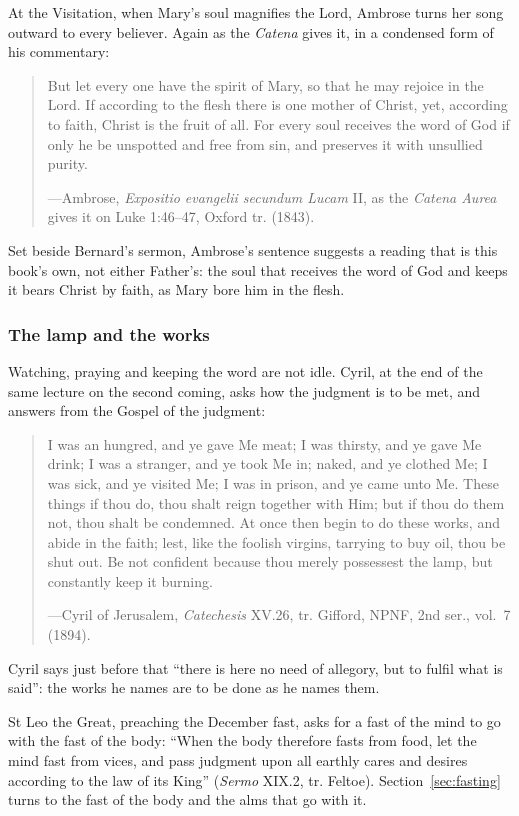 At the Visitation, when Mary's soul magnifies the Lord, Ambrose turns her song outward to every
believer. Again as the \textit{Catena} gives it, in a condensed form of his commentary:

\begin{quote}
But let every one have the spirit of Mary, so that he may rejoice in the Lord. If according to the
flesh there is one mother of Christ, yet, according to faith, Christ is the fruit of all. For every
soul receives the word of God if only he be unspotted and free from sin, and preserves it with
unsullied purity.\par
{\smallskip\noindent\small ---Ambrose, \textit{Expositio evangelii secundum Lucam} II, as the
\textit{Catena Aurea} gives it on Luke 1:46--47, Oxford tr. (1843).\par}
\end{quote}

Set beside Bernard's sermon, Ambrose's sentence suggests a reading that is this book's own, not
either Father's: the soul that receives the word of God and keeps it bears Christ by faith, as
Mary bore him in the flesh.

\subsubsection{The lamp and the works}

Watching, praying and keeping the word are not idle. Cyril, at the end of the same lecture on the
second coming, asks how the judgment is to be met, and answers from the Gospel of the judgment:

\begin{quote}
I was an hungred, and ye gave Me meat; I was thirsty, and ye gave Me drink; I was a stranger, and ye
took Me in; naked, and ye clothed Me; I was sick, and ye visited Me; I was in prison, and ye came
unto Me. These things if thou do, thou shalt reign together with Him; but if thou do them not, thou
shalt be condemned. At once then begin to do these works, and abide in the faith; lest, like the
foolish virgins, tarrying to buy oil, thou be shut out. Be not confident because thou merely
possessest the lamp, but constantly keep it burning.\par
{\smallskip\noindent\small ---Cyril of Jerusalem, \textit{Catechesis} XV.26, tr. Gifford, NPNF,
2nd ser., vol.~7 (1894).\par}
\end{quote}

\noindent Cyril says just before that ``there is here no need of allegory, but to fulfil what is
said'': the works he names are to be done as he names them.

St Leo the Great, preaching the December fast, asks for a fast of the mind to go with the fast of
the body: ``When the body therefore fasts from food, let the mind fast from vices, and pass
judgment upon all earthly cares and desires according to the law of its King'' (\textit{Sermo}
XIX.2, tr. Feltoe). Section~\ref{sec:fasting} turns to the fast of the body and the alms that go
with it.
